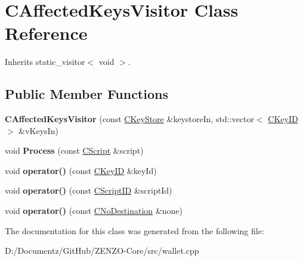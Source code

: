 \hypertarget{class_c_affected_keys_visitor}{}\section{C\+Affected\+Keys\+Visitor Class Reference}
\label{class_c_affected_keys_visitor}


Inherits static\+\_\+visitor$<$ void $>$.

\subsection*{Public Member Functions}
\begin{DoxyCompactItemize}
\item 
\mbox{\label{class_c_affected_keys_visitor_a97f7f932abb21ae791993a284183ab89}} 
{\bfseries C\+Affected\+Keys\+Visitor} (const \mbox{\hyperlink{class_c_key_store}{C\+Key\+Store}} \&keystore\+In, std\+::vector$<$ \mbox{\hyperlink{class_c_key_i_d}{C\+Key\+ID}} $>$ \&v\+Keys\+In)
\item 
\mbox{\label{class_c_affected_keys_visitor_a749859ce2a826e2d60c8fe31685efae3}} 
void {\bfseries Process} (const \mbox{\hyperlink{class_c_script}{C\+Script}} \&script)
\item 
\mbox{\label{class_c_affected_keys_visitor_abc13269c85eb964555cfe23c60b8c9b1}} 
void {\bfseries operator()} (const \mbox{\hyperlink{class_c_key_i_d}{C\+Key\+ID}} \&key\+Id)
\item 
\mbox{\label{class_c_affected_keys_visitor_a01b52c5a4311ae3985d1e5753e033215}} 
void {\bfseries operator()} (const \mbox{\hyperlink{class_c_script_i_d}{C\+Script\+ID}} \&script\+Id)
\item 
\mbox{\label{class_c_affected_keys_visitor_abeff400fed1ba87283930538f9164640}} 
void {\bfseries operator()} (const \mbox{\hyperlink{class_c_no_destination}{C\+No\+Destination}} \&none)
\end{DoxyCompactItemize}


The documentation for this class was generated from the following file\+:\begin{DoxyCompactItemize}
\item 
D\+:/\+Documentz/\+Git\+Hub/\+Z\+E\+N\+Z\+O-\/\+Core/src/wallet.\+cpp\end{DoxyCompactItemize}
